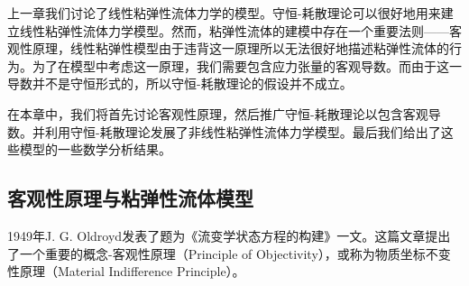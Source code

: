 \documentclass{article}
\begin{document}
上一章我们讨论了线性粘弹性流体力学的模型。守恒-耗散理论可以很好地用来建立线性粘弹性流体力学模型。然而，粘弹性流体的建模中存在一个重要法则——客观性原理，线性粘弹性模型由于违背这一原理所以无法很好地描述粘弹性流体的行为\cite{}。为了在模型中考虑这一原理，我们需要包含应力张量的客观导数。而由于这一导数并不是守恒形式的，所以守恒-耗散理论的假设并不成立。

在本章中，我们将首先讨论客观性原理，然后推广守恒-耗散理论以包含客观导数。并利用守恒-耗散理论发展了非线性粘弹性流体力学模型。最后我们给出了这些模型的一些数学分析结果。

\subsection{客观性原理与粘弹性流体模型}
1949年J. G. Oldroyd发表了题为《流变学状态方程的构建》一文\cite{}。这篇文章提出了一个重要的概念-客观性原理（Principle of Objectivity），或称为物质坐标不变性原理（Material Indifference Principle）。
\end{document}
